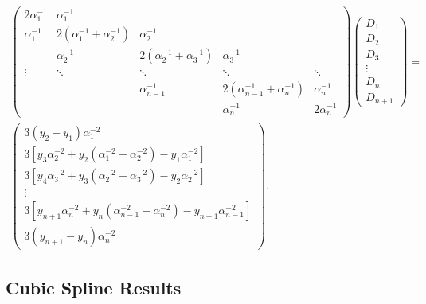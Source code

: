 \documentclass{scrartcl}
\begin{document}
\begin{align}
\left(\begin{array}{ccccc}
2\alpha_1^{-1}&\alpha_1^{-1}\\
  \alpha_1^{-1}&2(\alpha_1^{-1}+\alpha_2^{-1})&\alpha_2^{-1}\\
 &\alpha_2^{-1}&2(\alpha_2^{-1}+\alpha_3^{-1})&\alpha_3^{-1}\\
\vdots&\ddots&\ddots&\ddots&\ddots\\
&&\alpha_{n-1}^{-1}&2(\alpha_{n-1}^{-1}+\alpha_n^{-1})&\alpha_n^{-1}\\
&&&\alpha_n^{-1}&2\alpha_n^{-1}
\end{array}\right)
\left(\begin{array}{c}
D_1\\D_2\\D_3\\ \vdots\\D_n\\D_{n+1}
\end{array}\right) =\\
\left(\begin{array}{c}
3(y_2-y_1)\alpha_1^{-2}\\
3[y_3\alpha_2^{-2}
	+y_2(\alpha_1^{-2}
	-\alpha_2^{-2})
	-y_1\alpha_1^{-2}]\\
3[y_4\alpha_3^{-2}
	+y_3(\alpha_2^{-2}
	-\alpha_3^{-2})
	-y_2\alpha_2^{-2}]\\
\vdots\\
3[y_{n+1}\alpha_n^{-2}+y_n(\alpha_{n-1}^{-2}
	-\alpha_n^{-2})-y_{n-1}\alpha_{n-1}^{-2}]\\
3(y_{n+1}-y_n)\alpha_n^{-2}
\end{array}\right).\label{eq:eqtdi}
\end{align}

\subsection{Cubic Spline Results}
\end{document}
